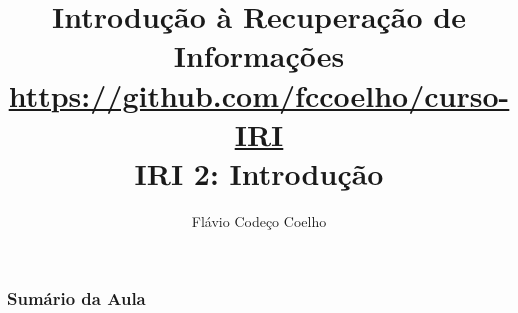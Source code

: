 \documentclass[compress]{beamer}
\title[Coelho: Introdução]
{Introdução à Recuperação de Informações\\
\large \url{https://github.com/fccoelho/curso-IRI}\\[0.5cm]
IRI 2: Introdução}
\author [Coelho F.C. \& Souza R.R.]{ Flávio Codeço Coelho}
\institute [EMAp, FGV]{Escola de Matemática Aplicada,   Fundação Getúlio Vargas}
\date
\begin{document}
\begin{frame}
\titlepage
\end{frame}

\begin{frame}[fragile]
\frametitle{Sumário da Aula}
\tableofcontents
\end{frame}
\end{document}

